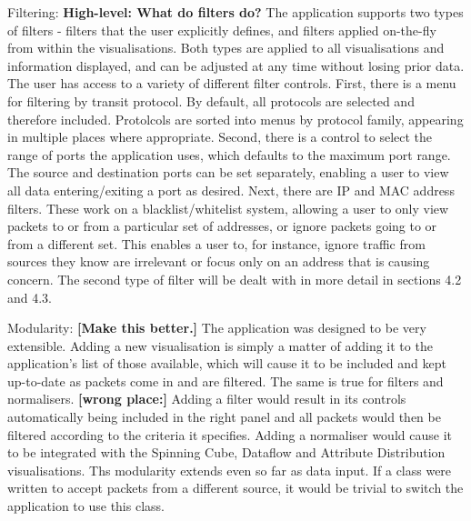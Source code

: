 Filtering:
\textbf{High-level: What do filters do?}
The application supports two types of filters - filters that the user explicitly defines, and filters applied on-the-fly from within the visualisations.
Both types are applied to all visualisations and information displayed, and can be adjusted at any time without losing prior data.
The user has access to a variety of different filter controls.  First, there is a menu for filtering by transit protocol. By default, all protocols are selected and therefore included. Protolcols are sorted into menus by protocol family, appearing in multiple places where appropriate. Second, there is a control to select the range of ports the application uses, which defaults to the maximum port range.  The source and destination ports can be set separately, enabling a user to view all data entering/exiting a port as desired.  Next, there are IP and MAC address filters.  These work on a blacklist/whitelist system, allowing a user to only view packets to or from a particular set of addresses, or ignore packets going to or from a different set.  This enables a user to, for instance, ignore traffic from sources they know are irrelevant or focus only on an address that is causing concern.
The second type of filter will be dealt with in more detail in sections 4.2 and 4.3.

Modularity: \textbf{[Make this better.]}
The application was designed to be very extensible.  Adding a new visualisation is simply a matter of adding it to the application's list of those available, which will cause it to be included and kept up-to-date as packets come in and are filtered.  The same is true for filters and normalisers.  \textbf{[wrong place:] }Adding a filter would result in its controls automatically being included in the right panel and all packets would then be filtered according to the criteria it specifies.  Adding a normaliser would cause it to be integrated with the Spinning Cube, Dataflow and Attribute Distribution visualisations.  Ths modularity extends even so far as data input.  If a class were written to accept packets from a different source, it would be trivial to switch the application to use this class.